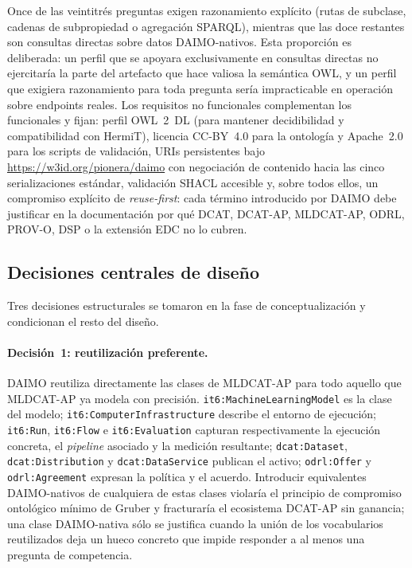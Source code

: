 \documentclass[11pt,a4paper]{article}
\newcommand{\code}[1]{\texttt{#1}}
\begin{document}
Once de las veintitrés preguntas exigen razonamiento explícito (rutas de subclase, cadenas de subpropiedad o agregación SPARQL), mientras que las doce restantes son consultas directas sobre datos DAIMO-nativos. Esta proporción es deliberada: un perfil que se apoyara exclusivamente en consultas directas no ejercitaría la parte del artefacto que hace valiosa la semántica OWL, y un perfil que exigiera razonamiento para toda pregunta sería impracticable en operación sobre endpoints reales. Los requisitos no funcionales complementan los funcionales y fijan: perfil OWL~2~DL (para mantener decidibilidad y compatibilidad con HermiT), licencia CC-BY~4.0 para la ontología y Apache~2.0 para los scripts de validación, URIs persistentes bajo \url{https://w3id.org/pionera/daimo} con negociación de contenido hacia las cinco serializaciones estándar, validación SHACL accesible y, sobre todos ellos, un compromiso explícito de \emph{reuse-first}: cada término introducido por DAIMO debe justificar en la documentación por qué DCAT, DCAT-AP, MLDCAT-AP, ODRL, PROV-O, DSP o la extensión EDC no lo cubren.

\subsection{Decisiones centrales de diseño}\label{sec:method-design}

Tres decisiones estructurales se tomaron en la fase de conceptualización y condicionan el resto del diseño.

\paragraph{Decisión~1: reutilización preferente.} DAIMO reutiliza directamente las clases de MLDCAT-AP para todo aquello que MLDCAT-AP ya modela con precisión. \code{it6:MachineLearningModel} es la clase del modelo; \code{it6:ComputerInfrastructure} describe el entorno de ejecución; \code{it6:Run}, \code{it6:Flow} e \code{it6:Evaluation} capturan respectivamente la ejecución concreta, el \emph{pipeline} asociado y la medición resultante; \code{dcat:Dataset}, \code{dcat:Distribution} y \code{dcat:DataService} publican el activo; \code{odrl:Offer} y \code{odrl:Agreement} expresan la política y el acuerdo. Introducir equivalentes DAIMO-nativos de cualquiera de estas clases violaría el principio de compromiso ontológico mínimo de Gruber y fracturaría el ecosistema DCAT-AP sin ganancia; una clase DAIMO-nativa sólo se justifica cuando la unión de los vocabularios reutilizados deja un hueco concreto que impide responder a al menos una pregunta de competencia.
\end{document}
